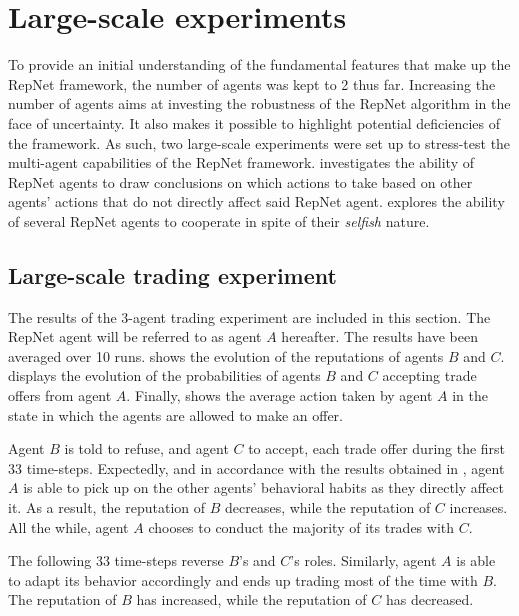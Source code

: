 \section{Large-scale experiments}
\label{sec:large}
To provide an initial understanding of the fundamental features that make up the RepNet framework, the number of agents was kept to 2 thus far. Increasing the number of agents aims at investing the robustness of the RepNet algorithm in the face of uncertainty. It also makes it possible to highlight potential deficiencies of the framework. As such, two large-scale experiments were set up to stress-test the multi-agent capabilities of the RepNet framework.  investigates the ability of RepNet agents to draw conclusions on which actions to take based on other agents' actions that do not directly affect said RepNet agent.  explores the ability of several RepNet agents to cooperate in spite of their \textit{selfish} nature.

\subsection{Large-scale trading experiment}
\label{sub:largetrade}
The results of the 3-agent trading experiment are included in this section. The RepNet agent will be referred to as agent $A$ hereafter. The results have been averaged over 10 runs.  shows the evolution of the reputations of agents $B$ and $C$.  displays the evolution of the probabilities of agents $B$ and $C$ accepting trade offers from agent $A$. Finally,  shows the average action taken by agent $A$ in the state in which the agents are allowed to make an offer.

Agent $B$ is told to refuse, and agent $C$ to accept, each trade offer during the first 33 time-steps. Expectedly, and in accordance with the results obtained in , agent $A$ is able to pick up on the other agents' behavioral habits as they directly affect it. As a result, the reputation of $B$ decreases, while the reputation of $C$ increases. All the while, agent $A$ chooses to conduct the majority of its trades with $C$.

The following 33 time-steps reverse $B$'s and $C$'s roles. Similarly, agent $A$ is able to adapt its behavior accordingly and ends up trading most of the time with $B$. The reputation of $B$ has increased, while the reputation of $C$ has decreased.

